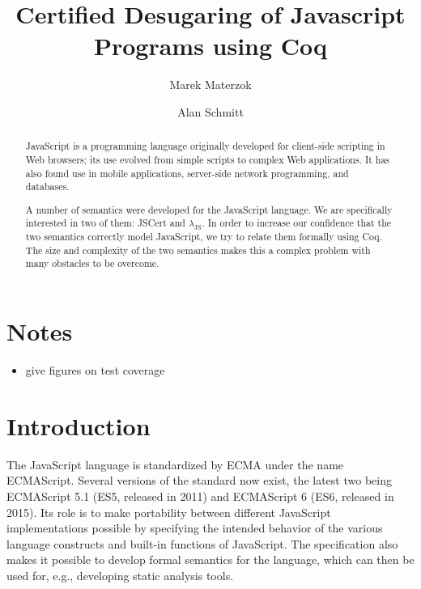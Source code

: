 \documentclass{llncs}
\begin{document}
\title{Certified Desugaring of Javascript Programs using Coq}

\author{Marek Materzok \and Alan Schmitt}

\maketitle

\newcommand{\lambdajs}{$\lambda_\textrm{JS}$}

\begin{abstract}
JavaScript is a programming language originally developed for client-side
scripting in Web browsers; its use evolved from simple scripts to
complex Web applications. It has also found use in mobile applications,
server-side network programming, and databases.

A number of semantics were developed for the JavaScript language.
We are specifically interested in two of them: JSCert and \lambdajs{}.
In order to increase our confidence that the two semantics correctly
model JavaScript, we try to relate them formally using Coq. The size and complexity
of the two semantics makes this a complex problem with many obstacles
to be overcome.
\end{abstract}

\section{Notes}

\begin{itemize}
\item give figures on test coverage
\end{itemize}

\section{Introduction}

The JavaScript language is standardized by ECMA under the name
ECMAScript. Several versions of the standard now exist, the latest
two being ECMAScript 5.1 (ES5, released in 2011) and ECMAScript 6
(ES6, released in 2015). Its role is to make portability between different
JavaScript implementations possible by specifying the intended behavior
of the various language constructs and built-in functions of JavaScript.
The specification also makes it possible to develop formal semantics
for the language, which can then be used for, e.g., developing
static analysis tools.
\end{document}
